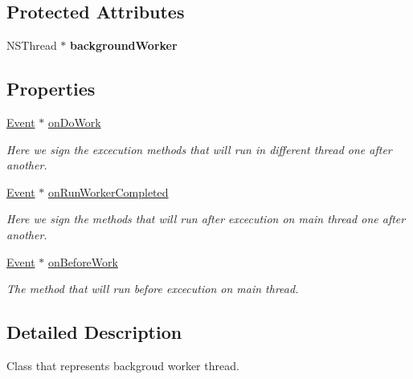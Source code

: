 \subsection*{\-Protected \-Attributes}
\begin{DoxyCompactItemize}
\item 
\hypertarget{interface_background_worker_a9fb3148d6e9c7e2c91d93ba943da1212}{
\-N\-S\-Thread $\ast$ {\bfseries background\-Worker}}
\label{interface_background_worker_a9fb3148d6e9c7e2c91d93ba943da1212}

\end{DoxyCompactItemize}
\subsection*{\-Properties}
\begin{DoxyCompactItemize}
\item 
\hyperlink{interface_event}{\-Event} $\ast$ \hyperlink{interface_background_worker_a23f3772d45b9471294508281602196af}{on\-Do\-Work}
\begin{DoxyCompactList}\small\item\em \-Here we sign the excecution methods that will run in different thread one after another. \end{DoxyCompactList}\item 
\hyperlink{interface_event}{\-Event} $\ast$ \hyperlink{interface_background_worker_a71f9bdc848a3ab29551644569db05ffa}{on\-Run\-Worker\-Completed}
\begin{DoxyCompactList}\small\item\em \-Here we sign the methods that will run after excecution on main thread one after another. \end{DoxyCompactList}\item 
\hyperlink{interface_event}{\-Event} $\ast$ \hyperlink{interface_background_worker_abe061a3706b92b0a9f10998d6758a0db}{on\-Before\-Work}
\begin{DoxyCompactList}\small\item\em \-The method that will run before excecution on main thread. \end{DoxyCompactList}\end{DoxyCompactItemize}


\subsection{\-Detailed \-Description}
\-Class that represents backgroud worker thread. 

